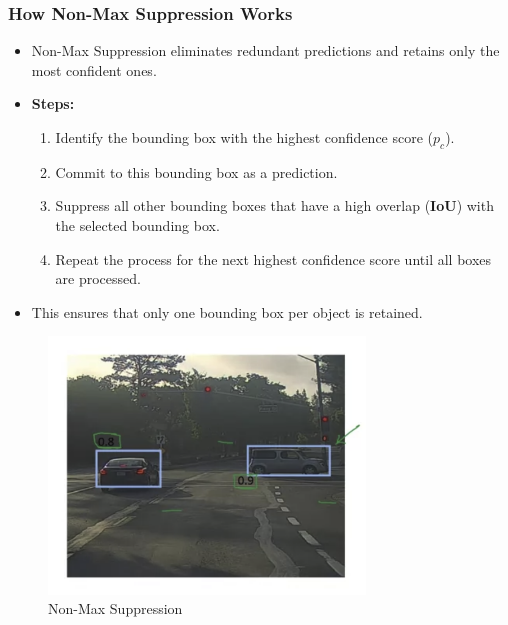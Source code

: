 \documentclass[letterpaper,12pt,notitlepage,twoside]{report}
\begin{document}
\subsubsection*{How Non-Max Suppression Works}
\begin{itemize}
    \item Non-Max Suppression eliminates redundant predictions and retains only the most confident ones.
    \item \textbf{Steps:}
    \begin{enumerate}
        \item Identify the bounding box with the highest confidence score ($p_c$).
        \item Commit to this bounding box as a prediction.
        \item Suppress all other bounding boxes that have a high overlap (\textbf{IoU}) with the selected bounding box.
        \item Repeat the process for the next highest confidence score until all boxes are processed.
    \end{enumerate}
    \item This ensures that only one bounding box per object is retained.
\end{itemize}

\begin{figure}[h]
	\centering
	\includegraphics[width=0.75\textwidth]{Images/Non-Max Suppression Working.png}
	\caption{Non-Max Suppression}
	\label{fig:44}
\end{figure}
\FloatBarrier
\end{document}
